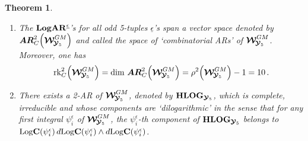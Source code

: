 \documentclass[11pt]{amsart}
\newcommand{\sk}{\smallskip}
\newtheorem{thm}{Theorem}[section]
\begin{document}
\begin{thm}
\begin{enumerate}
\item[3.]  The ${\bf LogAR}^{\underline{\epsilon}}$'s for all odd 5-tuples 
$\underline{\epsilon}$'s span 
a vector space denoted by 
$\boldsymbol{AR}^{2}_C\Big( 
 \boldsymbol{\mathcal W}^{GM}_{ \hspace{-0.05cm}
\boldsymbol{\mathcal Y}_5}\Big)$ and called the space of `combinatorial ARs' of 
$\boldsymbol{\mathcal W}^{GM}_{ \hspace{-0.05cm}
\boldsymbol{\mathcal Y}_5}$.  Moreover, one has 
$$
{\rm rk}^{2}_C
\Big( 
 \boldsymbol{\mathcal W}^{GM}_{ \hspace{-0.05cm}
\boldsymbol{\mathcal Y}_5}\Big)=\dim\, 
\boldsymbol{AR}^{2}_C\Big( 
 \boldsymbol{\mathcal W}^{GM}_{ \hspace{-0.05cm}
\boldsymbol{\mathcal Y}_5}\Big)
=\rho^{2}\Big(
\boldsymbol{\mathcal W}^{GM}_{ \hspace{-0.05cm}
\boldsymbol{\mathcal Y}_5}
\Big)-1=10
\,.
$$
\item[4.] There exists a 2-AR of $\boldsymbol{\mathcal W}^{GM}_{ \hspace{-0.05cm}
\boldsymbol{\mathcal Y}_5}$, denoted by ${\bf HLOG}_{ %
\boldsymbol{\mathcal Y}_5}$, which is 
complete, irreducible and 
 whose components are `dilogarithmic' in the sense that  
  for any 
 first integral $\psi_i^\epsilon$ of $\boldsymbol{\mathcal W}^{GM}_{ \hspace{-0.05cm}
\boldsymbol{\mathcal Y}_5}$, 
 the $\psi_i^\epsilon$-th component of 
 ${\bf HLOG}_{ \boldsymbol{\mathcal Y}_5 }$
  belongs to 
 ${\rm Log}\mathbf C(\psi_i^\epsilon)\,d{\rm Log}\mathbf C(\psi_i^\epsilon)\wedge  d{\rm Log}\mathbf C(\psi_i^\epsilon)$.\sk 
 

\end{enumerate}
\end{thm}
\end{document}
